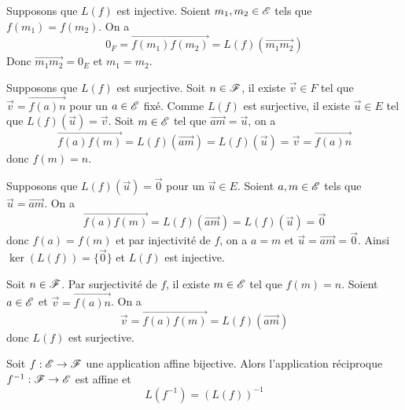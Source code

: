 \documentclass[a4paper, 12pt]{article}
\begin{document}
\begin{demonstration}
    \begin{description}[leftmargin=!,labelwidth=2.5cm]
        \item[\textbf{Injectivité:}] Supposons que $L(f)$ est injective.
        Soient $m_1, m_2 \in \mathscr{E}$ tels que $f(m_1) = f(m_2)$.
        On a
        $$
        0_F = \overrightarrow{f(m_1) f(m_2)} = L(f)(\overrightarrow{m_1 m_2})
        $$
        Donc $\overrightarrow{m_1 m_2} = 0_E$ et $m_1 = m_2$.

        \item[\textbf{Surjectivité:}] Supposons que $L(f)$ est surjective.
        Soit $n \in \mathscr{F}$, il existe $\vec{v} \in F$ tel que $\vec{v} = \overrightarrow{f(a) n}$ pour un $a \in \mathscr{E}$ fixé.
        Comme $L(f)$ est surjective, il existe $\vec{u} \in E$ tel que $L(f)(\vec{u}) = \vec{v}$.
        Soit $m \in \mathscr{E}$ tel que $\overrightarrow{a m} = \vec{u}$, on a
        $$
        \overrightarrow{f(a) f(m)} = L(f)(\overrightarrow{a m}) = L(f)(\vec{u}) = \vec{v} = \overrightarrow{f(a) n}
        $$
        donc $f(m) = n$.
        \item[\textbf{Injectivité réciproque:}] Supposons que $L(f)(\vec{u}) = \vec{0}$ pour un $\vec{u} \in E$.
        Soient $a, m \in \mathscr{E}$ tels que $\vec{u} = \overrightarrow{a m}$.
        On a
        $$
        \overrightarrow{f(a) f(m)} = L(f)(\overrightarrow{a m}) = L(f)(\vec{u}) = \vec{0}
        $$
        donc $f(a) = f(m)$ et par injectivité de $f$, on a $a = m$ et $\vec{u} = \overrightarrow{a m} = \vec{0}$.
        Ainsi $\ker(L(f)) = \{\vec{0}\}$ et $L(f)$ est injective.
        \item[\textbf{Surjectivité réciproque:}] Soit $n \in \mathscr{F}$.
        Par surjectivité de $f$, il existe $m \in \mathscr{E}$ tel que $f(m) = n$.
        Soient $a \in \mathscr{E}$ et $\vec{v} = \overrightarrow{f(a) n}$.
        On a
        $$
        \vec{v} = \overrightarrow{f(a) f(m)} = L(f)(\overrightarrow{a m})
        $$
        donc $L(f)$ est surjective.
    \end{description}
\end{demonstration}

\begin{proposition}{}{}
    Soit $f: \mathscr{E} \to \mathscr{F}$ une application affine bijective.
    Alors l'application réciproque $f^{-1}: \mathscr{F} \to \mathscr{E}$ est affine et
    $$
    L(f^{-1}) = (L(f))^{-1}
    $$
\end{proposition}
\end{document}
